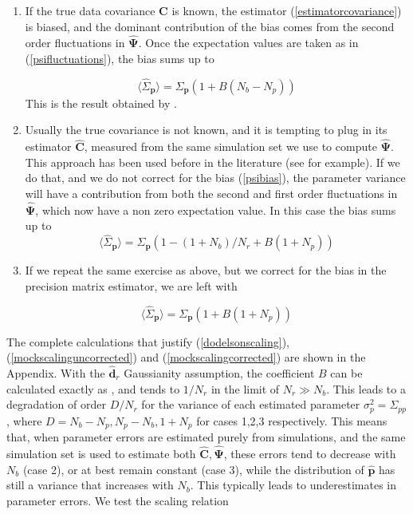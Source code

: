 \documentclass[reprint,aps,prd,superscriptaddress,showkeys,showpacs]{revtex4-1}
\newcommand{\bb}[1]{\mathbf{#1}}
\newcommand{\bbh}[1]{\mathbf{\hat{#1}}}
\newcommand{\h}[1]{\hat{#1}}
\begin{document}
\begin{enumerate}
\item If the true data covariance $\bb{C}$ is known, the estimator (\ref{estimatorcovariance}) is biased, and the dominant contribution of the bias comes from the second order fluctuations in $\bbh{\Psi}$. Once the expectation values are taken as in (\ref{psifluctuations}), the bias sums up to 

\begin{equation}
\label{dodelsonscaling}
\langle\h{\Sigma}_\bb{p}\rangle=\Sigma_\bb{p}(1+B(N_b-N_p))
\end{equation}
%
This is the result obtained by \citep{DodelsonSchneider13}.

\item Usually the true covariance is not known, and it is tempting to plug in its estimator $\bbh{C}$, measured from the same simulation set we use to compute $\bbh{\Psi}$. This approach has been used before in the literature (see \citep{MinkPetri,MinkShirasaki} for example). If we do that, and we do not correct for the bias (\ref{psibias}), the parameter variance will have a contribution from both the second and first order fluctuations in $\bbh{\Psi}$, which now have a non zero expectation value. In this case the bias sums up to 
\begin{equation}
\label{mockscalinguncorrected}
\langle\h{\Sigma}_\bb{p}\rangle=\Sigma_\bb{p}(1-(1+N_b)/N_r+B(1+N_p))
\end{equation}

\item If we repeat the same exercise as above, but we correct for the bias in the precision matrix estimator, we are left with 

\begin{equation}
\label{mockscalingcorrected}
\langle\h{\Sigma}_\bb{p}\rangle=\Sigma_\bb{p}(1+B(1+N_p))
\end{equation}

\end{enumerate} 
%
The complete calculations that justify (\ref{dodelsonscaling}),(\ref{mockscalinguncorrected}) and (\ref{mockscalingcorrected}) are shown in the Appendix. With the $\bbh{d}_r$ Gaussianity assumption, the coefficient $B$ can be calculated exactly as \citep{DodelsonSchneider13,Taylor12}, and tends to $1/N_r$ in the limit of $N_r\gg N_b$. This leads to a degradation of order $D/N_r$ for the variance of each estimated parameter $\sigma^2_p=\Sigma_{pp}$, where $D=N_b-N_p,N_p-N_b,1+N_p$ for cases 1,2,3 respectively. This means that, when parameter errors are estimated purely from simulations, and the same simulation set is used to estimate both $\bbh{C},\bbh{\Psi}$, these errors tend to decrease with $N_b$ (case 2), or at best remain constant (case 3), while the distribution of $\bbh{p}$ has still a variance that increases with $N_b$. This typically leads to underestimates in parameter errors. We test the scaling relation
\end{document}
